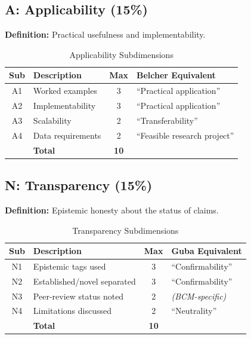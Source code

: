 \documentclass[11pt,a4paper]{article}
\begin{document}
\subsection{A: Applicability (15\%)}

\textbf{Definition:} Practical usefulness and implementability.

\begin{table}[h]
\centering
\caption{Applicability Subdimensions}
\begin{tabular}{clcp{6cm}}
\toprule
\textbf{Sub} & \textbf{Description} & \textbf{Max} & \textbf{Belcher Equivalent} \\
\midrule
A1 & Worked examples & 3 & ``Practical application'' \\
A2 & Implementability & 3 & ``Practical application'' \\
A3 & Scalability & 2 & ``Transferability'' \\
A4 & Data requirements & 2 & ``Feasible research project'' \\
\midrule
& \textbf{Total} & \textbf{10} & \\
\bottomrule
\end{tabular}
\end{table}

\subsection{N: Transparency (15\%)}

\textbf{Definition:} Epistemic honesty about the status of claims.

\begin{table}[h]
\centering
\caption{Transparency Subdimensions}
\begin{tabular}{clcp{6cm}}
\toprule
\textbf{Sub} & \textbf{Description} & \textbf{Max} & \textbf{Guba Equivalent} \\
\midrule
N1 & Epistemic tags used & 3 & ``Confirmability'' \\
N2 & Established/novel separated & 3 & ``Confirmability'' \\
N3 & Peer-review status noted & 2 & \textit{(BCM-specific)} \\
N4 & Limitations discussed & 2 & ``Neutrality'' \\
\midrule
& \textbf{Total} & \textbf{10} & \\
\bottomrule
\end{tabular}
\end{table}

\end{document}
